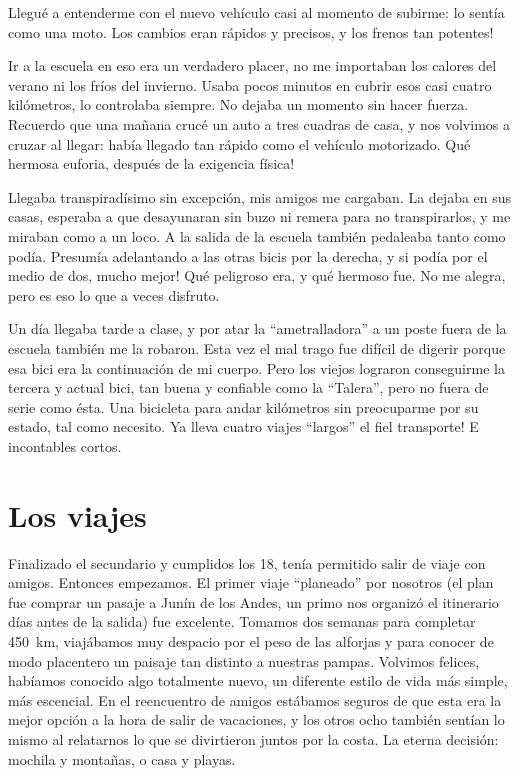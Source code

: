 \documentclass[11pt]{book}
\begin{document}
Llegu\'e a entenderme con el nuevo veh\'iculo casi al momento de subirme: lo
sent\'ia como una moto. Los cambios eran r\'apidos y precisos, \textexclamdown
y los frenos tan potentes!

Ir a la escuela en eso era un verdadero placer, no me importaban los calores del
verano ni los fr\'ios del invierno. Usaba pocos minutos en cubrir esos casi
cuatro kil\'ometros, lo controlaba siempre. No dejaba un momento sin hacer
fuerza. Recuerdo que una ma\~nana cruc\'e un auto a tres cuadras de casa, y nos
volvimos a cruzar al llegar: hab\'ia llegado tan r\'apido como el veh\'iculo
motorizado. \textexclamdown Qu\'e hermosa euforia, despu\'es de la exigencia
f\'isica!

Llegaba transpirad\'isimo sin excepci\'on, mis amigos me cargaban. La dejaba
en sus casas, esperaba a que desayunaran sin buzo ni remera para no
transpirarlos, y me miraban como a un loco. A la salida de la escuela
tambi\'en pedaleaba tanto como pod\'ia. Presum\'ia adelantando a las otras
bicis por la derecha, \textexclamdown y si pod\'ia por el medio de dos, mucho
mejor! Qu\'e peligroso era, y qu\'e hermoso fue. No me alegra, pero es eso lo
que a veces disfruto.

Un d\'ia llegaba tarde a clase, y por atar la ``ametralladora'' a un poste
fuera de la escuela tambi\'en me la robaron. Esta vez el mal trago fue
dif\'icil de digerir porque esa bici era la continuaci\'on de mi cuerpo. Pero
los viejos lograron conseguirme la tercera y actual bici, tan buena y
confiable como la ``Talera'', pero no fuera de serie como \'esta. Una
bicicleta para andar kil\'ometros sin preocuparme por su estado, tal como
necesito. \textexclamdown Ya lleva cuatro viajes ``largos'' el fiel
transporte! E incontables cortos.

\section{Los viajes}

Finalizado el secundario y cumplidos los 18, ten\'ia permitido salir de viaje
con amigos. Entonces empezamos. El primer viaje ``planeado'' por nosotros (el
plan fue comprar un pasaje a Jun\'in de los Andes, un primo nos organiz\'o el
itinerario d\'ias antes de la salida) fue excelente. Tomamos dos semanas para
completar 450~km, viaj\'abamos muy despacio por el peso de las alforjas y para
conocer de modo placentero un paisaje tan distinto a nuestras pampas. Volvimos
felices, hab\'iamos conocido algo totalmente nuevo, un diferente estilo de
vida m\'as simple, m\'as escencial. En el reencuentro de amigos est\'abamos
seguros de que esta era la mejor opci\'on a la hora de salir de vacaciones, y
los otros ocho tambi\'en sent\'ian lo mismo al relatarnos lo que se
divirtieron juntos por la costa. La eterna decisi\'on: mochila y monta\~nas, o
casa y playas.
\end{document}
